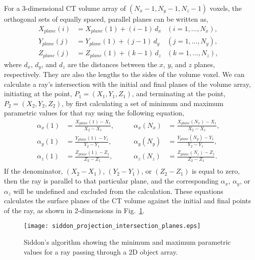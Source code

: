 For a 3-dimensional CT volume array of $(N_x -1, N_y-1, N_z-1)$ voxels, the orthogonal sets of equally spaced, parallel planes can be written as,
%
\begin{equation}
	\begin{aligned}
		X_{plane}(i) & = X_{plane}(1) + (i-1)\, d_x 	&(i = 1, ..., N_x),\\ 
		Y_{plane}(j) & = Y_{plane}(1) + (j-1)\, d_y  	&(j = 1, ..., N_y),\\
		Z_{plane}(j) & = Z_{plane}(1) + (k-1)\, d_z		&(k = 1, ..., N_z),
	\end{aligned}
	\label{eq:siddon_planes}
\end{equation}
%
where $d_x$, $d_y$, and $d_z$ are the distances between the $x$, $y$, and $z$ planes, respectively.  They are also the lengths to the sides of the volume voxel.  We can calculate a ray's intersection with the initial and final planes of the volume array, initiating at the point, $P_1 = (X_1, Y_1, Z_1)$, and terminating at the point, $P_2 = (X_2, Y_2, Z_2)$, by first calculating a set of minimum and maximum parametric values for that ray using the following equation,
%
\begin{equation}
\begin{aligned}
\alpha_x(1) &= \frac{X_{plane}(1) - X_1}{X_2 - X_1}, \qquad &\alpha_x(N_x) &= \frac{X_{plane}(N_x) - X_1}{X_2 - X_1}, \\
\alpha_y(1) &= \frac{Y_{plane}(1) - Y_1}{Y_2 - Y_1}, \qquad &\alpha_y(N_y) &= \frac{Y_{plane}(N_y) - Y_1}{Y_2 - Y_1}, \\
\alpha_z(1) &= \frac{Z_{plane}(1) - Z_1}{Z_2 - Z_1}, \qquad &\alpha_z(N_z) &= \frac{Z_{plane}(N_z) - Z_1}{Z_2 - Z_1}. \\
\end{aligned}
\label{eq:siddon_alpha_extremes}
\end{equation}
%
If the denominator, $(X_2 - X_1)$, $(Y_2-Y_1)$, or $(Z_2 - Z_1)$ is equal to zero, then the ray is parallel to that particular plane, and the corresponding $\alpha_x$, $\alpha_y$, or $\alpha_z$ will be undefined and excluded from the calculation.  These equations calculates the surface planes of the CT volume against the initial and final points of the ray, as shown in 2-dimensions in Fig.~\ref{fig:siddon_intersection_planes}.
%
\begin{figure}[ht]
\centering
\texttt{[image: siddon\_projection\_intersection\_planes.eps]}
\caption{Siddon's algorithm showing the minimum and maximum parametric values for a ray passing through a 2D object array.}
\label{fig:siddon_intersection_planes}
\end{figure}

